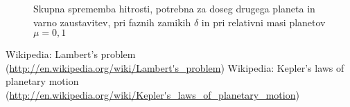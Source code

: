 \documentclass[a4paper,10pt]{article}
\begin{document}
\begin{figure}[H]
\centering
 
 \caption{Skupna sprememba hitrosti, potrebna za doseg drugega planeta in varno zaustavitev, pri faznih zamikih $\delta$ in pri relativni masi planetov $\mu=0,\!1$}
 \label{fig:hitrost-delta}
\end{figure}

\begin{thebibliography}{3}
  Wikipedia: Lambert's problem (\url{http://en.wikipedia.org/wiki/Lambert's_problem})
  Wikipedia: Kepler's laws of planetary motion (\url{http://en.wikipedia.org/wiki/Kepler's_laws_of_planetary_motion})
\end{thebibliography}
\end{document}
